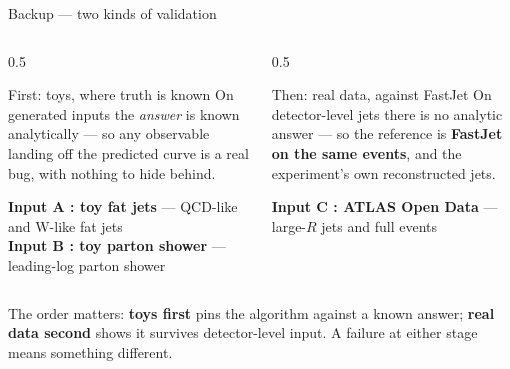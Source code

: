 \documentclass[aspectratio=169,10pt]{beamer}
\newcommand{\inputtag}[2]{{\footnotesize\textbf{\textcolor{#1}{#2}}}}
\newcommand{\toyAbody}{\inputtag{fjblue}{Input A : toy fat jets}}
\newcommand{\toyBbody}{\inputtag{fjblue}{Input B : toy parton shower}}
\newcommand{\realCbody}{\inputtag{fjgreen}{Input C : ATLAS Open Data}}
\begin{document}
\begin{frame}{Backup --- two kinds of validation}
\begin{columns}[T]
\begin{column}{0.5\textwidth}
\begin{block}{First: toys, where truth is known}
\small On generated inputs the \emph{answer} is known analytically --- so any
observable landing off the predicted curve is a real bug, with nothing to hide
behind.
\end{block}
\smallskip
\toyAbody{} --- QCD-like and W-like fat jets\\
\toyBbody{} --- leading-log parton shower
\end{column}
\begin{column}{0.5\textwidth}
\begin{block}{Then: real data, against FastJet}
\small On detector-level jets there is no analytic answer --- so the reference is
\textbf{FastJet on the same events}, and the experiment's own reconstructed jets.
\end{block}
\smallskip
\realCbody{} --- large-$R$ jets and full events
\end{column}
\end{columns}
\vspace{0.8em}
\begin{block}{}
\small The order matters: \textbf{toys first} pins the algorithm against a known
answer; \textbf{real data second} shows it survives detector-level input. A
failure at either stage means something different.
\end{block}
\end{frame}
\end{document}

